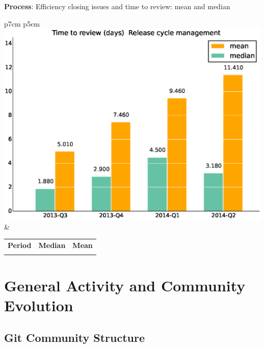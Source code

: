 \documentclass[a4wide,11pt]{report}
\begin{document}
\textbf{Process}: Efficiency closing issues and time to review: mean and median


\begin{tabular}{p{7cm} p{5cm}}
    \vspace{0pt} 
    \includegraphics[scale=.35]{figs/timetoreview_medianReleasecyclemanagement.eps}
    & 
    \vspace{0pt}
    \begin{tabular}{l|r|r|}%
    \bfseries Period & \bfseries Median & \bfseries Mean %
    \csvreader[head to column names]{data/timetoreview_medianReleasecyclemanagement.csv}{}%
    {\\ & \mediantime & \meantime}
    \end{tabular}
\end{tabular}


\chapter{General Activity and Community Evolution}

\section{Git Community Structure}
\end{document}

